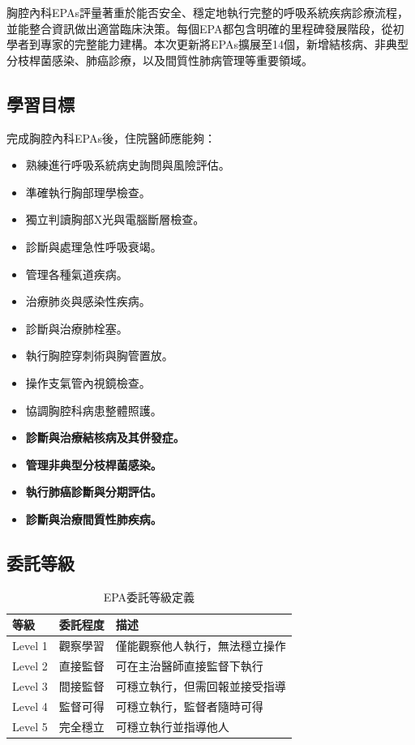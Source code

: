 \documentclass[12pt,a4paper]{article}
\newcommand{\note}[1]{
    \par
    \noindent
    \begin{tcolorbox}[
        colback=emergency_blue!5!white,
        colframe=emergency_blue,
        title=\textbf{重點提醒},
        fonttitle=\bfseries,
        boxrule=0.5pt,
        arc=3pt,
        left=6pt,
        right=6pt,
        top=6pt,
        bottom=6pt
    ]
    #1
    \end{tcolorbox}
}
\begin{document}
\vspace{0.5cm}
\note{
胸腔內科EPAs評量著重於能否安全、穩定地執行完整的呼吸系統疾病診療流程，並能整合資訊做出適當臨床決策。每個EPA都包含明確的里程碑發展階段，從初學者到專家的完整能力建構。本次更新將EPAs擴展至14個，新增結核病、非典型分枝桿菌感染、肺癌診療，以及間質性肺病管理等重要領域。
}

\subsection{學習目標}
完成胸腔內科EPAs後，住院醫師應能夠：
\begin{itemize}[nosep]
    \item 熟練進行呼吸系統病史詢問與風險評估。
    \item 準確執行胸部理學檢查。
    \item 獨立判讀胸部X光與電腦斷層檢查。
    \item 診斷與處理急性呼吸衰竭。
    \item 管理各種氣道疾病。
    \item 治療肺炎與感染性疾病。
    \item 診斷與治療肺栓塞。
    \item 執行胸腔穿刺術與胸管置放。
    \item 操作支氣管內視鏡檢查。
    \item 協調胸腔科病患整體照護。
    \item \textcolor{emergency_red}{\textbf{診斷與治療結核病及其併發症。}}
    \item \textcolor{emergency_red}{\textbf{管理非典型分枝桿菌感染。}}
    \item \textcolor{emergency_red}{\textbf{執行肺癌診斷與分期評估。}}
    \item \textcolor{emergency_red}{\textbf{診斷與治療間質性肺疾病。}}
\end{itemize}

\subsection{委託等級}
\begin{table}[h]
    \centering
    \caption{EPA委託等級定義}
    \begin{tabular}{p{2cm} p{3cm} p{9cm}}
        \toprule
        \textbf{等級} & \textbf{委託程度} & \textbf{描述} \\
        \midrule
        Level 1 & 觀察學習 & 僅能觀察他人執行，無法穩立操作 \\
        Level 2 & 直接監督 & 可在主治醫師直接監督下執行 \\
        Level 3 & 間接監督 & 可穩立執行，但需回報並接受指導 \\
        Level 4 & 監督可得 & 可穩立執行，監督者隨時可得 \\
        Level 5 & 完全穩立 & 可穩立執行並指導他人 \\
        \bottomrule
    \end{tabular}
\end{table}
\end{document}
